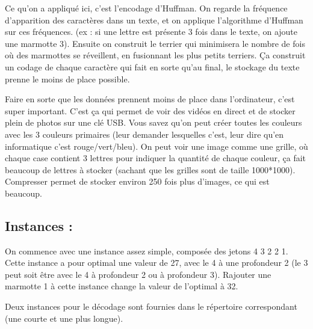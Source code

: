 \documentclass[12pt, a4paper]{article}
\begin{document}
Ce qu’on a appliqué ici, c’est l’encodage d’Huffman. On regarde la fréquence d’apparition des caractères dans un texte, et on applique
l’algorithme d’Huffman sur ces fréquences. (ex : si une lettre est présente 3 fois dans le texte, on ajoute une marmotte 3). Ensuite on
construit le terrier qui minimisera le nombre de fois où des marmottes se réveillent, en fusionnant les plus petits terriers. Ça construit
un codage de chaque caractère qui fait en sorte qu’au final, le stockage du texte prenne le moins de place possible.

Faire en sorte que les données prennent moins de place dans l’ordinateur, c’est super important. C’est ça qui permet de voir des vidéos
en direct et de stocker plein de photos sur une clé USB. Vous savez qu’on peut créer toutes les couleurs avec les 3 couleurs primaires
(leur demander lesquelles c’est, leur dire qu’en informatique c’est rouge/vert/bleu). On peut voir une image comme une grille, où chaque
case contient 3 lettres pour indiquer la quantité de chaque couleur, ça fait beaucoup de lettres à stocker (sachant que les grilles sont
de taille 1000*1000). Compresser permet de stocker environ 250 fois plus d’images, ce qui est beaucoup.

\subsection*{Instances :}
On commence avec une instance assez simple, composée des jetons 4 3 2 2 1. Cette instance a pour optimal une valeur de 27, avec le 4 à une
profondeur 2 (le 3 peut soit être avec le 4 à profondeur 2 ou à profondeur 3). Rajouter une marmotte 1 à cette instance change la
valeur de l'optimal à 32.

Deux instances pour le décodage sont fournies dans le répertoire correspondant (une courte et une plus longue).
\end{document}
